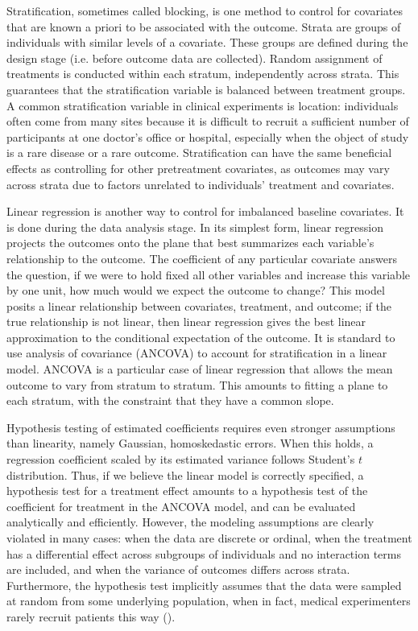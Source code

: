 \documentclass[12pt]{article}
\begin{document}
Stratification, sometimes called blocking, is one method to control for covariates that are known a priori to be associated with the outcome.
Strata are groups of individuals with similar levels of a covariate.
These groups are defined during the design stage (i.e. before outcome data are collected).
Random assignment of treatments is conducted within each stratum, independently across strata.
This guarantees that the stratification variable is balanced between treatment groups.
A common stratification variable in clinical experiments is location:
individuals often come from many sites because it is difficult to recruit a sufficient number of participants at one doctor's office or hospital,
especially when the object of study is a rare disease or a rare outcome.
Stratification can have the same beneficial effects as controlling for other pretreatment covariates, 
as outcomes may vary across strata due to factors unrelated to individuals' treatment and covariates.

Linear regression is another way to control for imbalanced baseline covariates.
It is done during the data analysis stage.
In its simplest form, linear regression projects the outcomes onto the plane that best summarizes each variable's relationship to the outcome.
The coefficient of any particular covariate answers the question, if we were to hold fixed all other variables and increase this variable by one unit, how much would we expect the outcome to change?
This model posits a linear relationship between covariates, treatment, and outcome; 
if the true relationship is not linear, then linear regression gives the best linear approximation to the conditional expectation of the outcome.
It is standard to use analysis of covariance (ANCOVA) to account for stratification in a linear model.
ANCOVA is a particular case of linear regression that allows the mean outcome to vary from stratum to stratum.
This amounts to fitting a plane to each stratum, with the constraint that they have a common slope.

Hypothesis testing of estimated coefficients requires even stronger assumptions than linearity, namely Gaussian, homoskedastic errors.
When this holds, a regression coefficient scaled by its estimated variance follows Student's $t$ distribution.
Thus, if we believe the linear model is correctly specified, a hypothesis test for a treatment effect amounts to a hypothesis test of the coefficient for treatment in the ANCOVA model, and can be evaluated analytically and efficiently.
However, the modeling assumptions are clearly violated in many cases:
when the data are discrete or ordinal, 
when the treatment has a differential effect across subgroups of individuals and no interaction terms are included, 
and when the variance of outcomes differs across strata.
Furthermore, the hypothesis test implicitly assumes that the data were sampled at random from some underlying population, when in fact,
medical experimenters rarely recruit patients this way (\cite{ludbrook_why_1998}).
\end{document}
